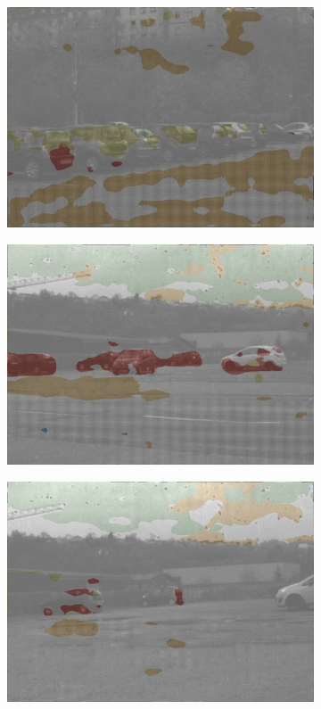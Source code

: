 \begin{figure}[h]
\begin{subfigure}[b]{0.18\linewidth}
		\includegraphics[width=\linewidth]{Figures/Aug/BA2/selected_images/overlayed/over4981.jpg}
	\end{subfigure}
	\begin{subfigure}[b]{0.18\linewidth}   
		\centering 
		\includegraphics[width=\linewidth]{Figures/Aug/BA2/selected_images/overlayed/over5142.jpg}
	\end{subfigure}
	\begin{subfigure}[b]{0.18\linewidth}   
		\centering 
		\includegraphics[width=\linewidth]{Figures/Aug/BA2/selected_images/overlayed/over5426.jpg}

\end{subfigure}
\end{figure}

